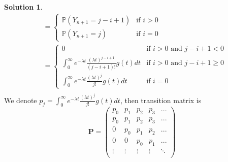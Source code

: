 \documentclass[a4paper, 10pt]{article}
\theoremstyle{definition}
\theoremstyle{hSol}
\newtheorem*{solution}{Solution}
\begin{document}
\begin{solution}
\begin{equation}
\begin{split}
    &= \begin{cases}
    \mathbb{P}\left(Y_{n+1} = j-i+1\right) & \text{if } i>0 \\
    \mathbb{P}\left(Y_{n+1}=j\right) & \text{if } i =0
    \end{cases} \\
    &= \begin{cases}
    0 & \text{if } i>0 \text{ and } j-i+1< 0\\
    \int_0^{\infty} e^{-\lambda t}\frac{(\lambda t)^{j-i+1}}{(j-i+1)!}g(t)dt & \text{if } i>0 \text{ and } j-i+1\geq 0\\
    \int_0^{\infty} e^{-\lambda t}\frac{(\lambda t)^j}{j!}g(t)dt & \text{if } i =0
    \end{cases} \\
  \end{split}
\end{equation}
We denote $p_j = \int_0^{\infty} e^{-\lambda t}\frac{(\lambda t)^j}{j!}g(t)dt$, then transition matrix is
\begin{equation}
  \bm{P} = \begin{pmatrix}
    p_0 & p_1 & p_2 & p_3 & ...  \\
    p_0 & p_1 & p_2 & p_3 & ...  \\
    0 & p_0 & p_1 & p_2 & ...  \\
    0 & 0 & p_0 & p_1 & ...  \\
    \vdots & \vdots & \vdots & \vdots & \ddots  \\
  \end{pmatrix}
\end{equation}
\end{solution}
\end{document}
